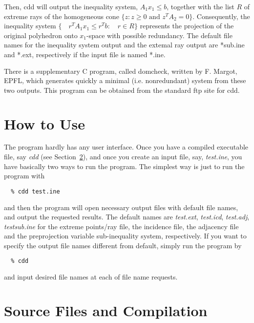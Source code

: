 \begin{description}
Then, cdd will output the inequality system,
$A_1 x_1  \le b$, together with the list $R$ of extreme
rays of the homogeneous cone  $\{z:  z  \ge 0  \mbox{ and }  z^T A_2 = 0 \}$.  
Consequently, the inequality system
$\{ \quad r^T A_1  x_1  \le  r^T b : \quad r \in  R \}$
represents the projection of the original polyhedron onto
$x_1$-space with possible redundancy.  The default file names
for the inequality system output and the extemal ray output are
*sub.ine and *.ext, respectively if the input file is named *.ine.  

There is a supplementary  C program, called domcheck, 
written by F. Margot, EPFL, which generates quickly a minimal
(i.e. nonredundant) system from these two outputs.
This program can be obtained from the standard ftp site for cdd.
\end{description}

\section{How to Use}  \label{HOWTO}

The program hardly has any user interface.  Once you have a compiled
executable file, say {\em cdd\/} (see Section~\ref{CAUTIONS}), 
and once you create an input file,
say, {\em test.ine\/}, you have basically two ways to run the program.
The simplest way is just to run the program with 
\begin{verbatim}
  % cdd test.ine
\end{verbatim}
and then the program will open necessary output files with
default file names, and output the requested results.
The default names are {\em test.ext\/}, {\em test.icd\/}, {\em test.adj\/},
{\em testsub.ine\/} for the extreme points/ray file, the incidence
file, the adjacency file and the preprojection variable sub-inequality
system, respectively.  If you want to specify the output file names
different from default, simply run the program by
\begin{verbatim}
  % cdd
\end{verbatim}
and input desired file names at each of file name requests.

\section{Source Files and Compilation}  \label{CAUTIONS}

